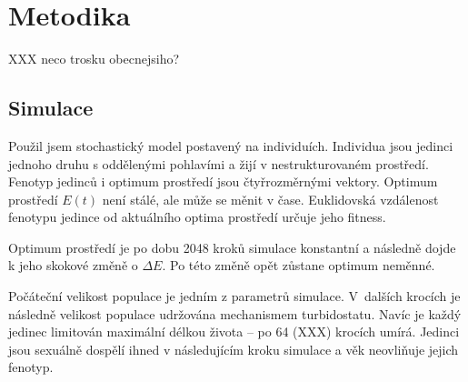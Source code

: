 \chapter{Metodika}



XXX neco trosku obecnejsiho?

\section{Simulace}

Použil jsem stochastický model postavený na individuích. Individua jsou jedinci jednoho druhu s oddělenými pohlavími a
žijí v nestrukturovaném prostředí. Fenotyp jedinců i optimum prostředí jsou čtyřrozměrnými vektory.
Optimum prostředí $E(t)$ není stálé, ale může se měnit v čase.
Euklidovská vzdálenost fenotypu jedince od aktuálního optima prostředí určuje jeho fitness.

Optimum prostředí je po dobu 2048 kroků simulace konstantní a následně dojde k jeho skokové změně o
$\Delta{}E$. Po této změně opět zůstane optimum neměnné.

Počáteční velikost populace je jedním z parametrů simulace. V~dalších krocích je následně velikost populace udržována
mechanismem turbidostatu.
Navíc je každý jedinec limitován maximální délkou života -- po 64 (XXX) krocích umírá.
Jedinci jsou sexuálně dospělí ihned v následujícím kroku simulace a věk neovliňuje jejich fenotyp.



